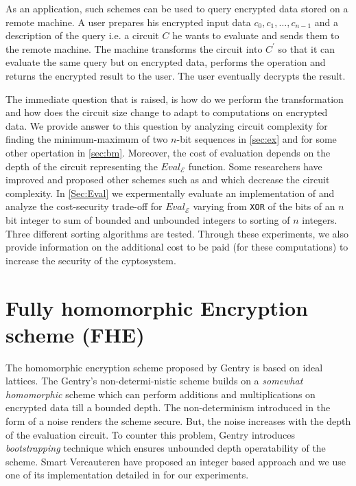 \documentclass{acm_proc_article-sp}
\begin{document}
As an application, such schemes can be used to query encrypted data stored on a remote machine. A user prepares his encrypted input data $c_0, c_1, \ldots, c_{n-1}$  and a description of the query i.e. a circuit $C$ he wants to evaluate and sends them to the remote machine. The machine transforms the circuit into $C^{'}$ so that it can evaluate the same query but on encrypted data, performs the operation and returns the encrypted result to the user. The user eventually decrypts the result. 

The immediate question that is raised, is how do we perform the transformation and how does the circuit size change to adapt to computations on encrypted data. We provide answer to this question by analyzing circuit complexity for finding the minimum-maximum of two $n$-bit sequences in \autoref{sec:ex} and for some other opertation in \autoref{sec:bm}. Moreover, the cost of evaluation depends on the depth of the circuit representing the $Eval_{\mathcal{E}}$ function. Some researchers have improved and proposed other schemes such as \cite{cryptoeprint:2009:571} and \cite{cryptoeprint:2011:277} which decrease the circuit complexity. In \autoref{Sec:Eval} we expermentally evaluate an implementation of  \cite{cryptoeprint:2009:571} and analyze the cost-security trade-off for $Eval_{\mathcal{E}}$ varying from \texttt{XOR} of the bits of an $n$ bit integer to sum of bounded and unbounded integers to sorting of $n$ integers. Three different sorting algorithms are tested.  
Through these experiments, we also provide information on the additional cost to be paid (for these computations) to increase the security of the cyptosystem.

\section{Fully homomorphic Encryption scheme (FHE) }

The homomorphic encryption scheme proposed by Gentry \cite{homenc} is based on ideal lattices. The Gentry's non-determi-nistic scheme builds on a \textit{somewhat homomorphic} scheme which can perform additions and multiplications on encrypted data till a bounded depth. The non-determinism introduced in the form of a noise renders the scheme secure. But, the noise increases with the depth  of the evaluation circuit. To counter this problem, Gentry introduces \textit{bootstrapping} technique which ensures unbounded depth operatability of the scheme. Smart Vercauteren \cite{cryptoeprint:2009:571} have proposed an integer based approach and we use one of its implementation detailed in \cite{perl:poster} for our experiments.
\end{document}
